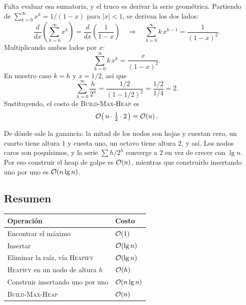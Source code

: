 \documentclass[11pt,letterpaper]{article}
\begin{document}
Falta evaluar esa sumatoria, y el truco es derivar la serie
geométrica. Partiendo de
$\sum_{k=0}^{\infty} x^{k} = 1/(1-x)$ para $|x| < 1$, se derivan los
dos lados:
\[
    \frac{d}{dx}\left( \sum_{k=0}^{\infty} x^{k} \right)
    = \frac{d}{dx}\left( \frac{1}{1-x} \right)
    \quad \Longrightarrow \quad
    \sum_{k=0}^{\infty} k\,x^{k-1} = \frac{1}{(1-x)^2} .
\]
Multiplicando ambos lados por $x$:
\[
    \sum_{k=0}^{\infty} k\,x^{k} = \frac{x}{(1-x)^2} .
\]
En nuestro caso $k = h$ y $x = 1/2$, así que
\[
    \sum_{h=0}^{\infty} \frac{h}{2^{h}}
    = \frac{1/2}{(1 - 1/2)^2}
    = \frac{1/2}{1/4}
    = 2 .
\]
Sustituyendo, el costo de \textsc{Build-Max-Heap} es
\[
    \mathcal{O}\!\left(\, n \cdot \tfrac{1}{2} \cdot 2 \,\right) = \mathcal{O}\!\left(n\right) .
\]

\begin{idea}
  De dónde sale la ganancia: la mitad de los nodos son hojas y
  cuestan cero, un cuarto tiene altura $1$ y cuesta uno, un octavo
  tiene altura $2$, y así. Los nodos caros son poquísimos, y la serie
  $\sum h/2^h$ converge a $2$ en vez de crecer con $\lg n$. Por eso
  construir el heap de golpe es $\mathcal{O}\!\left(n\right)$, mientras que construirlo
  insertando uno por uno es $\mathcal{O}\!\left(n \lg n\right)$.
\end{idea}


\subsection*{Resumen}

\begin{center}
\begin{tabular}{ll}
  \toprule
  \textbf{Operación} & \textbf{Costo} \\
  \midrule
  Encontrar el máximo         & $\mathcal{O}\!\left(1\right)$ \\
  Insertar                    & $\mathcal{O}\!\left(\lg n\right)$ \\
  Eliminar la raíz, vía \textsc{Heapify} & $\mathcal{O}\!\left(\lg n\right)$ \\
  \textsc{Heapify} en un nodo de altura $h$ & $\mathcal{O}\!\left(h\right)$ \\
  Construir insertando uno por uno & $\mathcal{O}\!\left(n \lg n\right)$ \\
  \textsc{Build-Max-Heap}     & $\mathcal{O}\!\left(n\right)$ \\
  \bottomrule
\end{tabular}
\end{center}

\newpage
\end{document}

